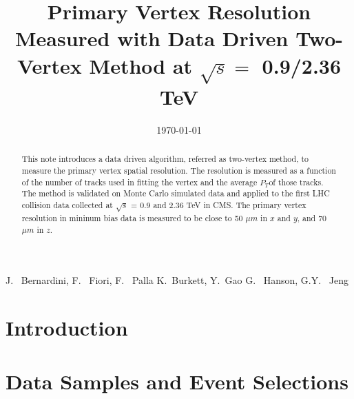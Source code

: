 \documentclass{cmspaper}
\newcommand{\pt} {\ensuremath{P_T}}
\begin{document}
%
\begin{titlepage}
\date{\today}

\title{Primary Vertex Resolution Measured with Data Driven Two-Vertex Method at $\sqrt{s} = $ 0.9/2.36 TeV}

  \begin{Authlist}
    J.~ Bernardini, F.~ Fiori, F.~ Palla
    K.~Burkett, Y.~Gao
    G.~ Hanson, G.Y.~ Jeng

  \end{Authlist}

\begin{abstract}

This note introduces a data driven algorithm, referred as two-vertex method, to 
measure the primary vertex spatial resolution. 
The resolution is measured as a function of the number of tracks used in fitting the 
vertex and the average \pt of those tracks. 
The method is validated on Monte Carlo simulated data and applied to 
the first LHC collision data collected at $\sqrt{s}$ = 0.9 and 2.36 TeV in CMS. 
The primary vertex resolution in mininum bias data is measured to be 
close to 50 $\mu m$ in $x$ and $y$, and 70 $\mu m$ in $z$. 
\end{abstract}
\end{titlepage}

\setcounter{page}{2}%
\tableofcontents
\pagebreak


\section {Introduction}
\label{sec:intro}


\section{Data Samples and Event Selections}
\label{sec:datasample}

\end{document}
